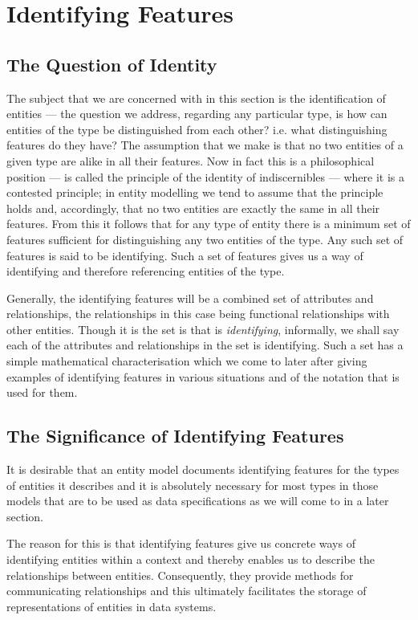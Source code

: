 \section{Identifying Features}
\label{IdentifyingFeatures}
\subsection{The Question of Identity}
\mynote
The subject that we are concerned with in this section 
is the identification of entities ---  the question we address, regarding any particular type, is how can entities of the type be distinguished from each other? 
i.e. what distinguishing features do they have? The assumption that we make is that no two entities of a given type are alike in all their features. Now in fact this is a philosophical position --- is called the principle of the identity of indiscernibles --- where it is a contested principle;  in entity modelling we tend to assume that the principle holds and, accordingly, that no two entities are exactly the same in all their features. From this it follows that for any type of entity there is a minimum set of features sufficient for distinguishing any two entities of the type. Any such set of features is said to be identifying.
Such a set of features gives us a way of identifying and therefore referencing entities of the type. 

 Generally, 
 the identifying features will be a combined set of attributes and relationships, 
 the relationships in this case being functional relationships with other entities. 
Though it is the set is that is \textit{identifying}, 
informally, we shall say each of the attributes and relationships in the set is identifying. 
Such a set has a simple mathematical characterisation which we come to later after giving examples  of identifying features in various situations and of the notation that is used for them.

\subsection{The Significance of Identifying Features}

\mynote 
It is desirable that an entity model documents identifying features for the types of entities it describes and  it is  absolutely necessary for most types in those models that are to be used as data specifications as we will come to in a later section. 

\mynote
The reason for this is that identifying features give us concrete ways of identifying entities within a context and thereby enables us to describe the relationships between entities. Consequently, they provide methods for communicating  relationships and this ultimately facilitates the storage of representations of entities in data systems.

